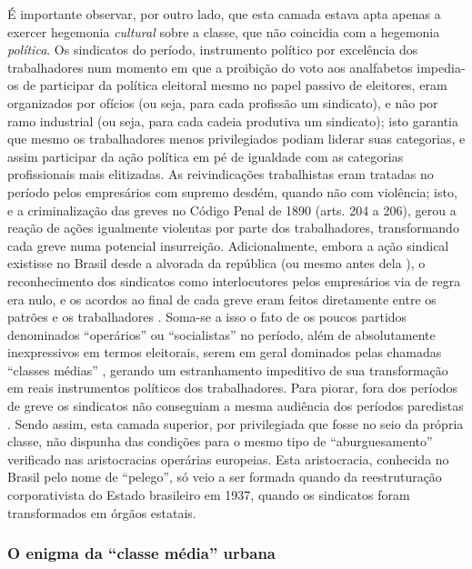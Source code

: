 É importante observar, por outro lado, que esta camada estava apta apenas a exercer hegemonia \textit{cultural} sobre a classe, que não coincidia com a hegemonia \textit{política}. Os sindicatos do período, instrumento político por excelência dos trabalhadores num momento em que a proibição do voto aos analfabetos impedia-os de participar da política eleitoral mesmo no papel passivo de eleitores, eram organizados por ofícios (ou seja, para cada profissão um sindicato), e não por ramo industrial (ou seja, para cada cadeia produtiva um sindicato); isto garantia que mesmo os trabalhadores menos privilegiados podiam liderar suas categorias, e assim participar da ação política em pé de igualdade com as categorias profissionais mais elitizadas. As reivindicações trabalhistas eram tratadas no período pelos empresários com supremo desdém, quando não com violência; isto, e a criminalização das greves no Código Penal de 1890 (arts. 204 a 206), gerou a reação de ações igualmente violentas por parte dos trabalhadores, transformando cada greve numa potencial insurreição. Adicionalmente, embora a ação sindical existisse no Brasil desde a alvorada da república (ou mesmo antes dela \cite[p.~69-77]{koval_prolbras_1982}), o reconhecimento dos sindicatos como interlocutores pelos empresários via de regra era nulo, e os acordos ao final de cada greve eram feitos diretamente entre os patrões e os trabalhadores \cite{dulles_anacombras_1977,koval_prolbras_1982}. Soma-se a isso o fato de os poucos partidos denominados ``operários'' ou ``socialistas'' no período, além de absolutamente inexpressivos em termos eleitorais, serem em geral dominados pelas chamadas ``classes médias'' \cite[p.~150]{pinheiro_prolind_1977}, gerando um estranhamento impeditivo de sua transformação em reais instrumentos políticos dos trabalhadores. Para piorar, fora dos períodos de greve os sindicatos não conseguiam a mesma audiência dos períodos paredistas \cite[p.~152]{pinheiro_prolind_1977}. Sendo assim, esta camada superior, por privilegiada que fosse no seio da própria classe, não dispunha das condições para o mesmo tipo de ``aburguesamento'' verificado nas aristocracias operárias europeias. Esta aristocracia, conhecida no Brasil pelo nome de ``pelego'', só veio a ser formada quando da reestruturação corporativista do Estado brasileiro em 1937, quando os sindicatos foram transformados em órgãos estatais.

\subsubsection{O enigma da ``classe média'' urbana}\label{subsubsec:clamed}

